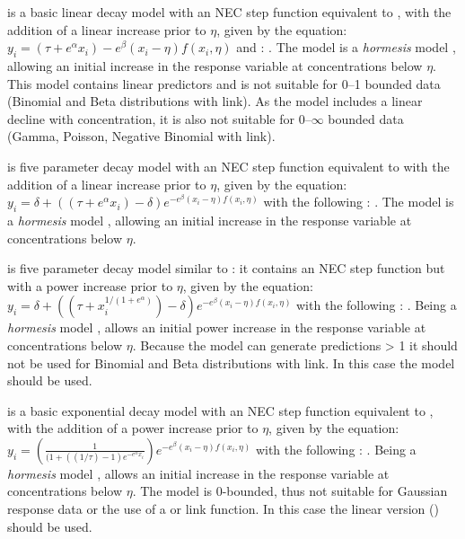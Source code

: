 \documentclass[
  shortnames]{jss}
\begin{document}
 is a basic linear decay model with an NEC step function equivalent to , with the addition of a linear increase prior to \(\eta\), given by the equation:
\(y_i = (\tau + e^{\alpha} x_i) - e^{\beta} \left(x_i - \eta \right) f(x_i, \eta)\)
and : . The  model is a \emph{hormesis} model \citep{Mattson2008}, allowing an initial increase in the response variable at concentrations below \(\eta\). This model contains linear predictors and is not suitable for 0--1 bounded data (Binomial and Beta distributions with  link). As the model includes a linear decline with concentration, it is also not suitable for 0--\(\infty\) bounded data (Gamma, Poisson, Negative Binomial with  link).

 is five parameter decay model with an NEC step function equivalent to  with the addition of a linear increase prior to \(\eta\), given by the equation:
\(y_i = \delta + ((\tau + e^{\alpha} x_i) - \delta ) e^{-e^{\beta} \left(x_i - \eta \right) f(x_i, \eta)}\)
with the following : . The  model is a \emph{hormesis} model \citep{Mattson2008}, allowing an initial increase in the response variable at concentrations below \(\eta\).

 is five parameter decay model similar to : it contains an NEC step function but with a power increase prior to \(\eta\), given by the equation:
\(y_i = \delta + ((\tau + x_i^{1/(1+e^{\alpha})}) - \delta) e^{-e^{\beta} \left(x_i - \eta \right) f(x_i, \eta)}\)
with the following : . Being a \emph{hormesis} model \citep{Mattson2008},  allows an initial power increase in the response variable at concentrations below \(\eta\). Because the model can generate predictions \textgreater{} 1 it should not be used for Binomial and Beta distributions with  link. In this case the  model should be used.

 is a basic exponential decay model with an NEC step function equivalent to , with the addition of a power increase prior to \(\eta\), given by the equation:
\(y_i = \left(\frac{1}{(1 + ((1/\tau)-1) e^{-e^{\alpha}x_i}}\right) e^{-e^{\beta} \left(x_i - \eta \right) f(x_i, \eta)}\)
with the following : . \linebreak Being a \emph{hormesis} model \citep{Mattson2008},  allows an initial increase in the response variable at concentrations below \(\eta\). The model is 0-bounded, thus not suitable for Gaussian response data or the use of a  or  link function. In this case the linear version () should be used.
\end{document}
